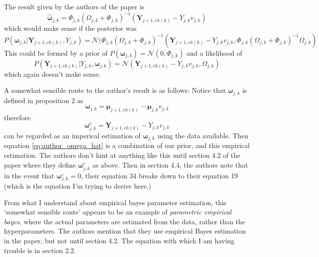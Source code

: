\documentclass[a4paper,12pt]{article}
\theoremstyle{definition}
\begin{document}
The result given by the authors of the paper is
\begin{equation}\label{eq:author_omega_hat}
  \hat{\boldsymbol{\omega}}_{j,k} = \Phi_{j,k}(\Omega_{j,k} + \Phi_{j,k})^{-1}(\mathbf{Y}_{j+1, ch(k)} - Y_{j,k}v_{j,k})
\end{equation}
which would make sense if the posterior was
\begin{equation}
  P(\boldsymbol{\omega}_{j,k} | \mathbf{Y}_{j+1, ch(k)}, Y_{j,k}) = \mathcal{N}(\Phi_{j,k}(\Omega_{j,k} + \Phi_{j,k})^{-1}(\mathbf{Y}_{j+1, ch(k)} - Y_{j,k}v_{j,k}, \Phi_{j,k}(\Omega_{j,k} + \Phi_{j,k})^{-1} \Omega_{j,k})
\end{equation}
This could be formed by a prior of $P(\boldsymbol{\omega}_{j,k}) = \mathcal{N}(0, \Phi_{j,k})$ and a likelihood of
\begin{equation}
  P(\mathbf{Y}_{j+1, ch(k)} | Y_{j,k}, \boldsymbol{\omega}_{j,k}) = \mathcal{N}(\mathbf{Y}_{j+1, ch(k)} - Y_{j,k}v_{j,k}, \Omega_{j,k})
\end{equation}
which again doesn't make sense.

A somewhat sensible route to the author's result is as follows: Notice that $\boldsymbol{\omega}_{j,k}$ is defined in proposition 2 as
\begin{equation}
  \boldsymbol{\omega}_{j,k} = \boldsymbol{\mu}_{j+1,ch(k)} - \boldsymbol{\mu}_{j,k}v_{j,k}
\end{equation}
therefore
\begin{equation}
  \boldsymbol{\omega}_{j,k}^e = \mathbf{Y}_{j+1, ch(k)} - Y_{j,k}v_{j,k}
\end{equation}
can be regarded as an imperical estimation of $\boldsymbol{\omega}_{j,k}$ using the data available. Then equation \ref{eq:author_omega_hat} is a combination of our prior, and this empirical estimation. The authors don't hint at anything like this until section 4.2 of the paper where they define $\boldsymbol{\omega}_{j,k}^e$ as above. Then in section 4.4, the authors note that in the event that $\boldsymbol{\omega}_{j,k}^{\circ} = 0$, their equation 34 breaks down to their equation 19 (which is the equation I'm trying to derive here.)

From what I understand about empirical bayes parameter estimation, this `somewhat sensible route' appears to be an example of \textit{parametric empirical bayes}, where the actual parameters are estimated from the data, rather than the hyperparameters. The authors mention that they use empirical Bayes estimation in the paper, but not until section 4.2. The equation with which I am having trouble is in section 2.2.
\end{document}
